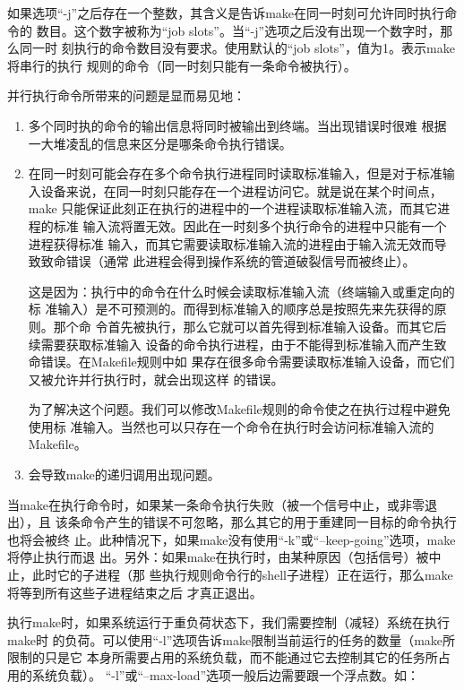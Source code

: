 如果选项“-j”之后存在一个整数，其含义是告诉make在同一时刻可允许同时执行命令的
数目。这个数字被称为“job slots”。当“-j”选项之后没有出现一个数字时，那么同一时
刻执行的命令数目没有要求。使用默认的“job slots”，值为1。表示make将串行的执行
规则的命令（同一时刻只能有一条命令被执行）。

并行执行命令所带来的问题是显而易见地：

\begin{enumerate}
\itemsep=0pt \parskip=4pt
\item       多个同时执的命令的输出信息将同时被输出到终端。当出现错误时很难
    根据一大堆凌乱的信息来区分是哪条命令执行错误。
\item 在同一时刻可能会存在多个命令执行进程同时读取标准输入，但是对于标准输
    入设备来说，在同一时刻只能存在一个进程访问它。就是说在某个时间点，make
    只能保证此刻正在执行的进程中的一个进程读取标准输入流，而其它进程的标准
    输入流将置无效。因此在一时刻多个执行命令的进程中只能有一个进程获得标准
    输入，而其它需要读取标准输入流的进程由于输入流无效而导致致命错误（通常
    此进程会得到操作系统的管道破裂信号而被终止）。

    这是因为：执行中的命令在什么时候会读取标准输入流（终端输入或重定向的标
准输入）是不可预测的。而得到标准输入的顺序总是按照先来先获得的原则。那个命
令首先被执行，那么它就可以首先得到标准输入设备。而其它后续需要获取标准输入
设备的命令执行进程，由于不能得到标准输入而产生致命错误。在Makefile规则中如
果存在很多命令需要读取标准输入设备，而它们又被允许并行执行时，就会出现这样
的错误。

为了解决这个问题。我们可以修改Makefile规则的命令使之在执行过程中避免使用标
准输入。当然也可以只存在一个命令在执行时会访问标准输入流的Makefile。

\item        会导致make的递归调用出现问题。
\end{enumerate}

当make在执行命令时，如果某一条命令执行失败（被一个信号中止，或非零退出），且
该条命令产生的错误不可忽略，那么其它的用于重建同一目标的命令执行也将会被终
止。此种情况下，如果make没有使用“-k”或“--keep-going”选项，make将停止执行而退
出。另外：如果make在执行时，由某种原因（包括信号）被中止，此时它的子进程（那
些执行规则命令行的shell子进程）正在运行，那么make将等到所有这些子进程结束之后
才真正退出。

执行make时，如果系统运行于重负荷状态下，我们需要控制（减轻）系统在执行make时
的负荷。可以使用“-l”选项告诉make限制当前运行的任务的数量（make所限制的只是它
本身所需要占用的系统负载，而不能通过它去控制其它的任务所占用的系统负载）。
“-l”或“--max-load”选项一般后边需要跟一个浮点数。如：


